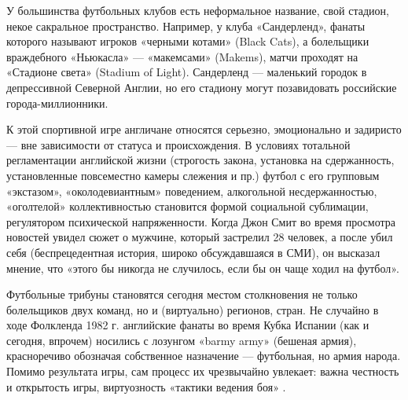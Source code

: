 У большинства футбольных клубов есть неформальное название, свой стадион, некое сакральное пространство. Например, у клуба «Сандерленд», фанаты которого называют игроков «черными котами» (Black Cats), а болельщики враждебного «Ньюкасла» — «макемсами» (Makems), матчи проходят на «Стадионе света» (Stadium of Light). Сандерленд — маленький городок в депрессивной Северной Англии, но его стадиону могут позавидовать российские города-миллионники.

К этой спортивной игре англичане относятся серьезно, эмоционально и задиристо — вне зависимости от статуса и происхождения. В условиях тотальной регламентации английской жизни (строгость закона, установка на сдержанность, установленные повсеместно камеры слежения и пр.) футбол с его групповым «экстазом», «околодевиантным» поведением, алкогольной несдержанностью, «оголтелой» коллективностью становится формой социальной сублимации, регулятором психической напряженности. Когда Джон Смит во время просмотра новостей увидел сюжет о мужчине, который застрелил 28 человек, а после убил себя (беспрецедентная история, широко обсуждавшаяся в СМИ), он высказал мнение, что «этого бы никогда не случилось, если бы он чаще ходил на футбол».

Футбольные трибуны становятся сегодня местом столкновения не только болельщиков двух команд, но и (виртуально) регионов, стран. Не случайно в ходе Фолкленда 1982 г. английские фанаты во время Кубка Испании (как и сегодня, впрочем) носились с лозунгом «barmy army» (бешеная армия), красноречиво обозначая собственное назначение — футбольная, но армия народа. Помимо результата игры, сам процесс их чрезвычайно увлекает: важна честность и открытость игры, виртуозность «тактики ведения боя» \cite{football}.



























